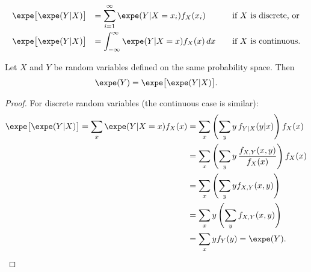 \[
\begin{array}{lll}
\expe\big[\expe(Y|X)\big] & = \displaystyle\sum_{i=1}^{\infty}\expe(Y|X=x_i)f_X(x_i)		& \quad\text{if $X$ is discrete, or} \\[3ex]
\expe\big[\expe(Y|X)\big] & = \displaystyle\int_{-\infty}^{\infty} \expe(Y|X=x)f_X(x)\,dx	& \quad\text{if $X$ is continuous.} 
\end{array}
\]

\begin{theorem}
Let $X$ and $Y$ be random variables defined on the same probability space. Then
\[
\expe(Y) = \expe\big[\expe(Y|X)\big].
\]
\end{theorem}
\begin{proof}
For discrete random variables (the continuous case is similar):
\begin{align*}
\expe\big[\expe(Y|X)\big] 
	= \sum_x \expe(Y|X=x) f_X(x) 
	& = \sum_x\left(\sum_y y\,f_{Y|X}(y|x)\right) f_X(x) \\
	& = \sum_x\left(\sum_y y\,\frac{f_{X,Y}(x,y)}{f_X(x)}\right) f_X(x) \\
	& = \sum_x\left(\sum_y y f_{X,Y}(x,y)\right) \\
	& = \sum_x y \left(\sum_y f_{X,Y}(x,y)\right) \\
	& = \sum_x y f_Y(y)  
	= \expe(Y).
\end{align*}
\end{proof}

